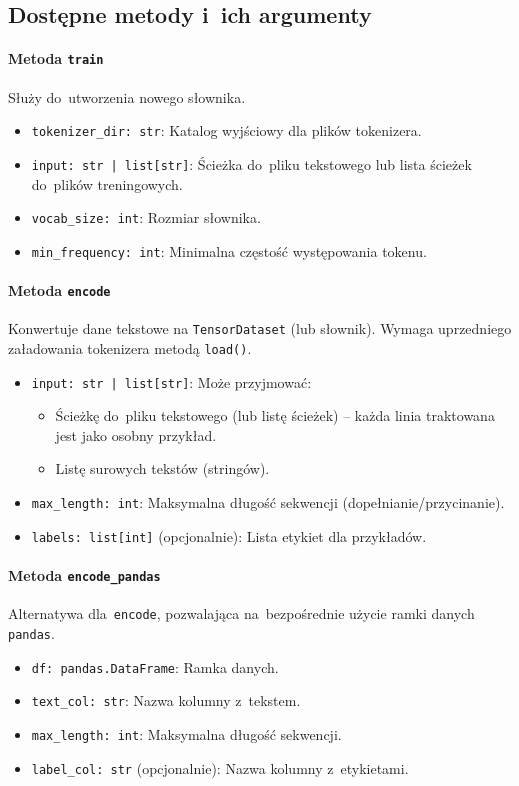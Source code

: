 \documentclass[a4paper,11pt,twoside]{report}
\theoremstyle{definition}
\begin{document}
\subsection{Dostępne metody i~ich argumenty}

\paragraph{Metoda \texttt{train}}
Służy do~utworzenia nowego słownika.
\begin{itemize}
    \item \texttt{tokenizer\_dir: \texttt{str}}: Katalog wyjściowy dla plików tokenizera.
    \item \texttt{input: \texttt{str | list[str]}}: Ścieżka do~pliku tekstowego lub lista ścieżek do~plików treningowych.
    \item \texttt{vocab\_size: \texttt{int}}: Rozmiar słownika.
    \item \texttt{min\_frequency: \texttt{int}}: Minimalna częstość występowania tokenu.
\end{itemize}

\paragraph{Metoda \texttt{encode}}
Konwertuje dane tekstowe na \texttt{TensorDataset} (lub słownik). Wymaga uprzedniego załadowania tokenizera metodą \texttt{load()}.
\begin{itemize}
    \item \texttt{input: \texttt{str | list[str]}}: Może przyjmować:
    \begin{itemize}
        \item Ścieżkę do~pliku tekstowego (lub listę ścieżek) -- każda linia traktowana jest jako osobny przykład.
        \item Listę surowych tekstów (stringów).
    \end{itemize}
    \item \texttt{max\_length: \texttt{int}}: Maksymalna długość sekwencji (dopełnianie/przycinanie).
    \item \texttt{labels: \texttt{list[int]}} (opcjonalnie): Lista etykiet dla przykładów.
\end{itemize}

\paragraph{Metoda \texttt{encode\_pandas}}
Alternatywa dla~\texttt{encode}, pozwalająca na~bezpośrednie użycie ramki danych \texttt{pandas}.
\begin{itemize}
    \item \texttt{df: \texttt{pandas.DataFrame}}: Ramka danych.
    \item \texttt{text\_col: \texttt{str}}: Nazwa kolumny z~tekstem.
    \item \texttt{max\_length: \texttt{int}}: Maksymalna długość sekwencji.
    \item \texttt{label\_col: \texttt{str}} (opcjonalnie): Nazwa kolumny z~etykietami.
\end{itemize}
\end{document}
